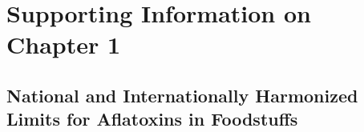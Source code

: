 \section{Supporting Information on Chapter 1} \label{Annex_chap1}


 

\subsection*{National and Internationally Harmonized Limits for Aflatoxins in Foodstuffs} %

